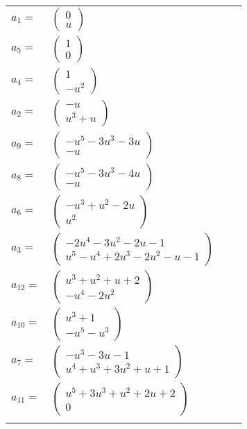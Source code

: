 \documentclass[1p]{elsarticle_modified}
\theoremstyle{definition}
\begin{document}
\begin{tabular}{m{7pt} m{180pt} m{7pt} m{180pt} }
\flushright $a_{1}=$&$\begin{pmatrix}0\\u\end{pmatrix}$ \\
\flushright $a_{5}=$&$\begin{pmatrix}1\\0\end{pmatrix}$ \\
\flushright $a_{4}=$&$\begin{pmatrix}1\\- u^2\end{pmatrix}$ \\
\flushright $a_{2}=$&$\begin{pmatrix}- u\\u^3+u\end{pmatrix}$ \\
\flushright $a_{9}=$&$\begin{pmatrix}- u^5-3 u^3-3 u\\- u\end{pmatrix}$ \\
\flushright $a_{8}=$&$\begin{pmatrix}- u^5-3 u^3-4 u\\- u\end{pmatrix}$ \\
\flushright $a_{6}=$&$\begin{pmatrix}- u^3+u^2-2 u\\u^2\end{pmatrix}$ \\
\flushright $a_{3}=$&$\begin{pmatrix}-2 u^4-3 u^2-2 u-1\\u^5- u^4+2 u^3-2 u^2- u-1\end{pmatrix}$ \\
\flushright $a_{12}=$&$\begin{pmatrix}u^3+u^2+u+2\\- u^4-2 u^2\end{pmatrix}$ \\
\flushright $a_{10}=$&$\begin{pmatrix}u^3+1\\- u^5- u^3\end{pmatrix}$ \\
\flushright $a_{7}=$&$\begin{pmatrix}- u^3-3 u-1\\u^4+u^3+3 u^2+u+1\end{pmatrix}$ \\
\flushright $a_{11}=$&$\begin{pmatrix}u^5+3 u^3+u^2+2 u+2\\0\end{pmatrix}$\\&\end{tabular}
\end{document}
